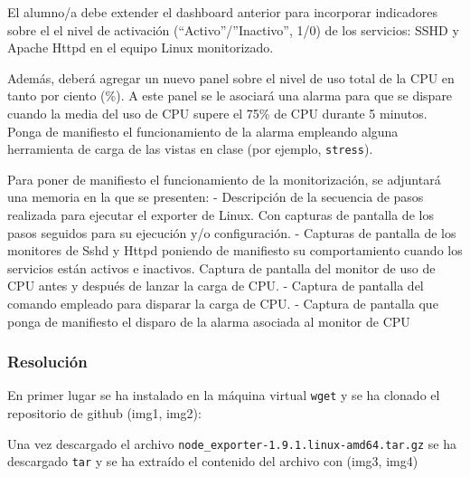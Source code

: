 El alumno/a debe extender el dashboard anterior para incorporar
indicadores sobre el el nivel de activación (``Activo''/''Inactivo'',
1/0) de los servicios: SSHD y Apache Httpd en el equipo Linux
monitorizado.

Además, deberá agregar un nuevo panel sobre el nivel de uso total de la
CPU en tanto por ciento (\%). A este panel se le asociará una alarma
para que se dispare cuando la media del uso de CPU supere el 75\% de CPU
durante 5 minutos. Ponga de manifiesto el funcionamiento de la alarma
empleando alguna herramienta de carga de las vistas en clase (por
ejemplo, \texttt{stress}).

Para poner de manifiesto el funcionamiento de la monitorización, se
adjuntará una memoria en la que se presenten: - Descripción de la
secuencia de pasos realizada para ejecutar el exporter de Linux. Con
capturas de pantalla de los pasos seguidos para su ejecución y/o
configuración. - Capturas de pantalla de los monitores de Sshd y Httpd
poniendo de manifiesto su comportamiento cuando los servicios están
activos e inactivos. Captura de pantalla del monitor de uso de CPU antes
y después de lanzar la carga de CPU. - Captura de pantalla del comando
empleado para disparar la carga de CPU. - Captura de pantalla que ponga
de manifiesto el disparo de la alarma asociada al monitor de CPU

\hypertarget{resoluciuxf3n}{%
\subsubsection{Resolución}\label{resoluciuxf3n}}

En primer lugar se ha instalado en la máquina virtual \texttt{wget} y se
ha clonado el repositorio de github (img1, img2):

\begin{Shaded}
\begin{Highlighting}[]
\end{Highlighting}
\end{Shaded}

Una vez descargado el archivo
\texttt{node\_exporter-1.9.1.linux-amd64.tar.gz} se ha descargado
\texttt{tar} y se ha extraído el contenido del archivo con (img3, img4)

\begin{Shaded}
\begin{Highlighting}[]
 
\end{Highlighting}
\end{Shaded}

